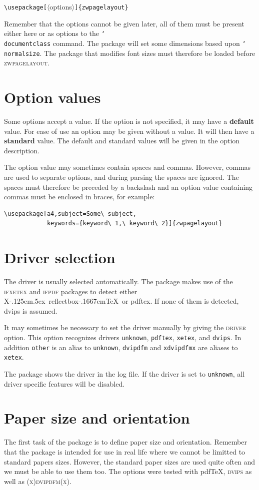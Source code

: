 \documentclass[11pt]{article}
\def\omg#1{\ifvmode\leavevmode\fi\marginpar{\raggedright\hspace{0pt}\opt{#1}}\ignorespaces}
\def\opt#1{\texorpdfstring{\textmd{\textsc{#1}}}{#1}}
\let\pkg\textsc
\DeclareRobustCommand\cmd[1]{\texttt{\char`\\#1}}
\DeclareRobustCommand\XeTeX{X\kern-.125em\lower.5ex\hbox{\csname
              reflectbox\endcsname{E}}\kern-.1667em\TeX}
\begin{document}
\vb
\verb;\usepackage[;$\langle$options$\rangle$\verb;]{zwpagelayout};

\vb\noindent
Remember that the options cannot be given later, all of them must be present either here or as
options to the \cmd{documentclass} command. The package will set some dimensions based upon
\cmd{normalsize}. The package that modifies font sizes must therefore be loaded before
\pkg{zwpagelayout}.

\section{Option values}

Some options accept a value. If the option is not specified, it may have a \textbf{default} value. For ease of use an
option may be given without a value. It will then have a \textbf{standard} value. The default and standard
values will be given in the option description.

The option value may sometimes contain spaces and commas. However, commas are used to separate
options, and during parsing the spaces are ignored. The spaces must therefore be preceded by a
backslash and an option value containing commas must be enclosed in braces, for example:

\vb
\begin{verbatim}
\usepackage[a4,subject=Some\ subject,
            keywords={keyword\ 1,\ keyword\ 2}]{zwpagelayout}
\end{verbatim}

\section{Driver selection}\label{driver.selection}
The driver is usually selected automatically. The package makes use of the \pkg{ifxetex} and
\pkg{ifpdf} packages to detect either \XeTeX\ or pdftex. If none of them is detected, dvips is
assumed.

\omg{driver}
It may sometimes be necessary to set the driver manually by giving the \opt{driver} option. This
option recognizes drivers \texttt{unknown}, \texttt{pdftex}, \texttt{xetex}, and \texttt{dvips}. In
addition \texttt{other} is an alias to \texttt{unknown}, \texttt{dvipdfm} and \texttt{xdvipdfmx}
are aliases to \texttt{xetex}.

The package shows the driver in the log file. If the driver is set to \texttt{unknown}, all driver
specific features will be disabled.

\section{Paper size and orientation}
The first task of the package is to define paper size and orientation. Remember that the package is
intended for use in real life where we cannot be limitted to standard papers sizes. However, the
standard paper sizes are used quite often and we must be able to use them too. The options were
tested with pdf\TeX, \pkg{dvips} as well as \pkg{(x)dvipdfm(x)}.
\end{document}
